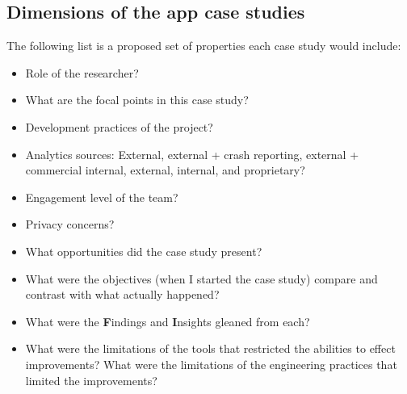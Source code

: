 \subsection{Dimensions of the app case studies}
The following list is a proposed set of properties each case study would include:
{\small
\begin{itemize}
    \itemsep0em
    \item Role of the researcher?
    \item What are the focal points in this case study?
    \item Development practices of the project?
    \item Analytics sources: External, external + crash reporting, external + commercial internal, external, internal, and proprietary?
    \item Engagement level of the team?
    \item Privacy concerns?
    \item What opportunities did the case study present?
    \item What were the objectives (when I started the case study) compare and contrast with what actually happened? 
    \item What were the \textbf{F}indings and \textbf{I}nsights gleaned from each?
    \item What were the limitations of the tools that restricted the abilities to effect improvements? What were the limitations of the engineering practices that limited the improvements?
\end{itemize}
}

